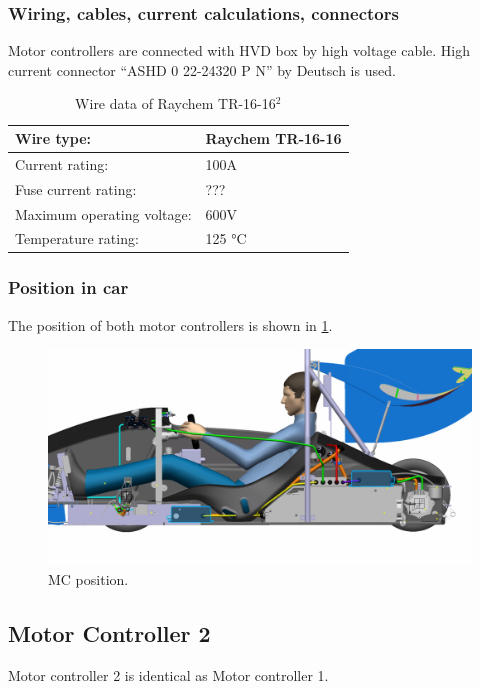 \subsubsection{Wiring, cables, current calculations, connectors}

Motor controllers are connected with HVD box by high voltage cable. High current connector “ASHD 0 22-24320 P N” by Deutsch is used. 

\begin{table}[H]
	\centering
	\caption{Wire data of Raychem TR-16-16$^2$}
	\begin{tabularx}{\textwidth}{|X|X|}\hline
		Wire type: & Raychem TR-16-16  \\[\TableSize]\hline
		Current rating: & 100A \\[\TableSize]\hline
		Fuse current rating: & ??? \\[\TableSize]\hline
		Maximum operating voltage: & 600V \\[\TableSize]\hline
		Temperature rating: & 125 °C \\[\TableSize]\hline
	\end{tabularx}%
	\label{tab:MC:wire}%
\end{table}%

\subsubsection{Position in car}

The position of both motor controllers is shown in \ref{fig:MC:position}.

\begin{figure}[H]
	\centering
	\includegraphics[width=\textwidth]{./img/MC-position.jpg}
	\caption{MC position.}
	\label{fig:MC:position}
\end{figure}
\subsection{Motor Controller 2}
Motor controller 2 is identical as Motor controller 1.




